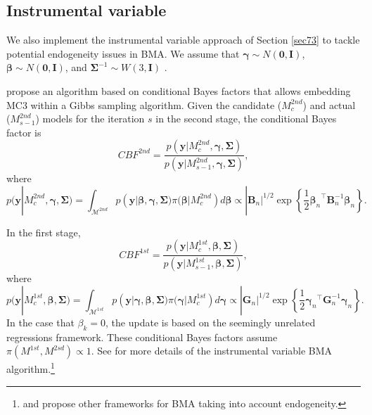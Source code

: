 
\subsection{Instrumental variable }\label{sec10_21}

We also implement the instrumental variable approach of Section \ref{sec73} to tackle potential endogeneity issues in BMA. We assume that $\bm{\gamma}\sim {N}(\bm{0},\bm{I})$, $\bm{\beta}\sim {N}(\bm{0},\bm{I})$, and $\bm{\Sigma}^{-1} \sim {W}(3,\bm{I})$ \cite{Karl2012}.

\cite{Lenkoski2013} propose an algorithm based on conditional Bayes factors \cite{Dickey1978} that allows embedding MC3 within a Gibbs sampling algorithm. Given the candidate ($M_{c}^{2nd}$) and actual ($M_{s-1}^{2nd}$) models for the iteration $s$ in the second stage, the conditional Bayes factor is 
\begin{equation*}
	CBF^{2nd}=\frac{p(\bm{y}|M_{c}^{2nd},\bm{\gamma},\bm{\Sigma})}{p(\bm{y}|M_{s-1}^{2nd},\bm{\gamma},\bm{\Sigma})},
\end{equation*}
where 
\begin{equation*}
	p(\bm{y}|M_{c}^{2nd},\bm{\gamma},\bm{\Sigma})=\int_{\mathcal{M}^{2nd}}p(\bm{y}|\bm{\beta},\bm{\gamma},\bm{\Sigma})\pi(\bm{\beta}|M_{c}^{2nd})d\bm{\beta}\propto |\bm{B}_n|^{1/2} \exp\left\{\frac{1}{2}{\bm{\beta}_n}^{\top}\bm{B}_n^{-1}\bm{\beta}_n\right\}
	.
\end{equation*}

In the first stage,
\begin{equation*}
	CBF^{1st}=\frac{p(\bm{y}|M_{c}^{1st},\bm{\beta},\bm{\Sigma})}{p(\bm{y}|M_{s-1}^{1st},\bm{\beta},\bm{\Sigma})},
\end{equation*}
where \begin{equation*}
	p(\bm{y}|M_{c}^{1st},\bm{\beta},\bm{\Sigma})=\int_{\mathcal{M}^{1st}}p(\bm{y}|\bm{\gamma},\bm{\beta},\bm{\Sigma})\pi(\bm{\gamma}|M_{c}^{1st})d\bm{\gamma}\propto |\bm{G}_n|^{1/2} \exp\left\{\frac{1}{2}{\bm{\gamma}_n}^{\top}\bm{G}_n^{-1}\bm{\gamma}_n\right\}.
\end{equation*}
In the case that $\beta_k=0$, the update is based on the seemingly unrelated regressions framework. These conditional Bayes factors assume $\pi(M^{1st},M^{2sd})\propto 1$. See \cite{Lenkoski2013} for more details of the instrumental variable BMA algorithm.\footnote{\cite{Koop12} and \cite{Lenkoski2014} propose other frameworks for BMA taking into account endogeneity.}\\

